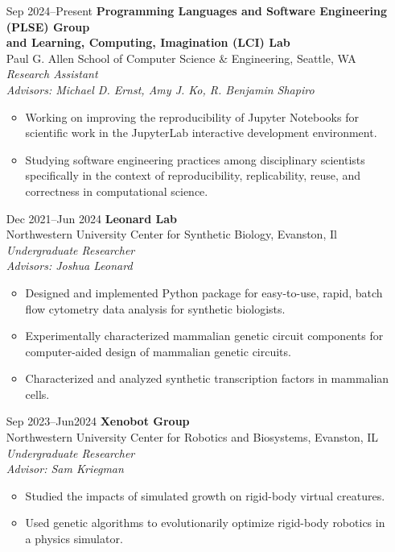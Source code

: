 \documentclass{article}
\begin{document}
\begin{itemize}[leftmargin=1.5in]
    \item[Sep 2024–Present] \textbf{Programming Languages and Software Engineering (PLSE) Group\\and Learning, Computing, Imagination (LCI) Lab}\\
    Paul G. Allen School of Computer Science \& Engineering, Seattle, WA\\
    \textit{Research Assistant}\\
    \textit{Advisors: Michael D. Ernst, Amy J. Ko, R. Benjamin Shapiro}
    \begin{itemize}
        \item Working on improving the reproducibility of Jupyter Notebooks for scientific work in the JupyterLab interactive development environment.
        \item Studying software engineering practices among disciplinary scientists specifically in the context of reproducibility, replicability, reuse, and correctness in computational science.
    \end{itemize}
    \item[Dec 2021–Jun 2024] \textbf{Leonard Lab}\\
    Northwestern University Center for Synthetic Biology, Evanston, Il\\
    \textit{Undergraduate Researcher}\\
    \textit{Advisors: Joshua Leonard}
    \begin{itemize}
        \item Designed and implemented Python package for easy-to-use, rapid, batch flow cytometry data analysis for synthetic biologists.
        \item Experimentally characterized mammalian genetic circuit components for computer-aided design of mammalian genetic circuits.
        \item Characterized and analyzed synthetic transcription factors in mammalian cells.
    \end{itemize}
    \item[Sep 2023–Jun2024] \textbf{Xenobot Group}\\
     Northwestern University Center for Robotics and Biosystems, Evanston, IL\\
    \textit{Undergraduate Researcher}\\
    \textit{Advisor: Sam Kriegman}
    \begin{itemize}
        \item Studied the impacts of simulated growth on rigid-body virtual creatures.
        \item Used genetic algorithms to evolutionarily optimize rigid-body robotics in a physics simulator.
    \end{itemize}
\end{itemize}
\end{document}
